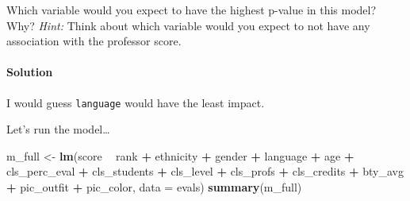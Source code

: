 \documentclass[]{article}
\newenvironment{Shaded}{\begin{snugshade}}{\end{snugshade}}
\newcommand{\KeywordTok}[1]{\textcolor[rgb]{0.13,0.29,0.53}{\textbf{#1}}}
\newcommand{\DataTypeTok}[1]{\textcolor[rgb]{0.13,0.29,0.53}{#1}}
\newcommand{\StringTok}[1]{\textcolor[rgb]{0.31,0.60,0.02}{#1}}
\newcommand{\OperatorTok}[1]{\textcolor[rgb]{0.81,0.36,0.00}{\textbf{#1}}}
\newcommand{\NormalTok}[1]{#1}
\let\oldparagraph\paragraph
\renewcommand{\paragraph}[1]{\oldparagraph{#1}\mbox{}}
\begin{document}
Which variable would you expect to have the highest p-value in this
model? Why? \emph{Hint:} Think about which variable would you expect to
not have any association with the professor score.

\paragraph{Solution}\label{solution-10}

I would guess \texttt{language} would have the least impact.

Let's run the model\ldots{}

\begin{Shaded}
\begin{Highlighting}[]
\NormalTok{m_full <-}\StringTok{ }\KeywordTok{lm}\NormalTok{(score }\OperatorTok{~}\StringTok{ }\NormalTok{rank }\OperatorTok{+}\StringTok{ }\NormalTok{ethnicity }\OperatorTok{+}\StringTok{ }\NormalTok{gender }\OperatorTok{+}\StringTok{ }\NormalTok{language }\OperatorTok{+}\StringTok{ }\NormalTok{age }\OperatorTok{+}\StringTok{ }\NormalTok{cls_perc_eval }
             \OperatorTok{+}\StringTok{ }\NormalTok{cls_students }\OperatorTok{+}\StringTok{ }\NormalTok{cls_level }\OperatorTok{+}\StringTok{ }\NormalTok{cls_profs }\OperatorTok{+}\StringTok{ }\NormalTok{cls_credits }\OperatorTok{+}\StringTok{ }\NormalTok{bty_avg }
             \OperatorTok{+}\StringTok{ }\NormalTok{pic_outfit }\OperatorTok{+}\StringTok{ }\NormalTok{pic_color, }\DataTypeTok{data =}\NormalTok{ evals)}
\KeywordTok{summary}\NormalTok{(m_full)}
\end{Highlighting}
\end{Shaded}
\end{document}
